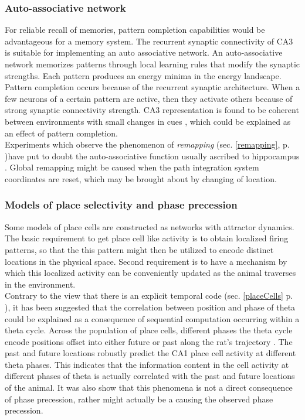 \subsubsection{Auto-associative network}
\label{autoasso}
For reliable recall of memories, pattern completion capabilities would be advantageous for a memory system. The recurrent synaptic connectivity of CA3 is suitable for implementing an auto associative network. An auto-associative network memorizes patterns through local learning rules that modify the synaptic strengths. Each pattern produces an energy minima in the energy landscape. Pattern completion occurs because of the recurrent synaptic architecture. When a few neurons of a certain pattern are active, then they activate others because of strong synaptic connectivity strength. CA3 representation is found to be coherent between environments with small changes in cues \cite{Lee2004, Vazdarjanova2004}, which could be explained as an effect of pattern completion. \\
Experiments which observe the phenomenon of \emph{remapping} \cite{Kubie1987, Wills2005, Leutgeb2005} (sec. \ref{remapping}, p. \pageref{remapping})have put to doubt the auto-associative function usually ascribed to  hippocampus \cite{Colgin2010}. Global remapping might be caused when the path integration system coordinates are reset, which may be brought about by changing of location.   

\subsubsection{Models of place selectivity and phase precession}
Some models of place cells are constructed as networks with attractor dynamics. The basic requirement to get place cell like activity is to obtain localized firing patterns, so that the this pattern might then be utilized to encode distinct locations in the physical space. Second requirement is to have a mechanism by which this localized activity can be conveniently updated as the animal traverses in the environment.  \\

Contrary to the view that there is an explicit temporal code (sec. \ref{placeCells} p. \pageref{placeCells}), it has been suggested that the correlation between position and phase of theta could be explained as a consequence of sequential computation occurring within a theta cycle. Across the population of place cells, different phases the theta cycle encode positions offset into either future or past along the rat's trajectory \cite{Itskov2008}. The past and future locations robustly predict the CA1 place cell activity at different theta phases. This indicates that the information content in the cell activity at different phases of theta is actually correlated with the past and future locations of the animal. It was also show that this phenomena is not a direct consequence of phase precession, rather might actually be a causing the observed phase precession. \\

